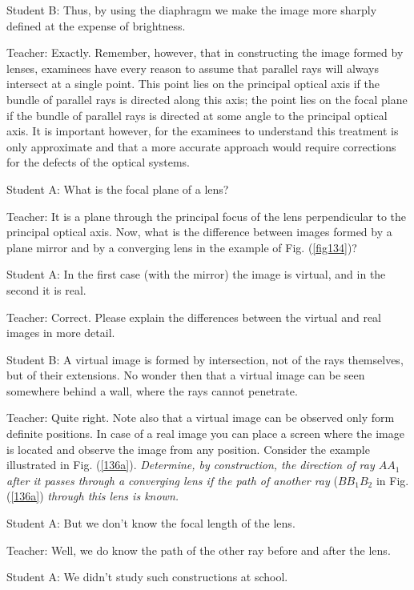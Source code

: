 \documentclass[a4paper,12pt]{book}
\begin{document}
{{\sc Student B:} Thus, by using the diaphragm we make the image more sharply defined at the expense of brightness.

{\sc Teacher:} Exactly. Remember, however, that in constructing the image formed by lenses, examinees have every reason to assume that parallel rays will always intersect at a single point. This point lies on the principal optical axis if the bundle of parallel rays is directed along this axis; the point lies on the focal plane if the bundle of parallel rays is directed at some angle to the principal optical axis. It is important however, for the examinees to understand this treatment is only approximate and that a more accurate approach would require corrections for the defects of the optical systems.

{\sc Student A:} What is the focal plane of a lens?

{\sc Teacher:} It is a plane through the principal focus of the lens perpendicular to the principal optical axis. Now, what is the difference between images formed by a plane mirror and by a converging lens in the example of Fig. (\ref{fig134})?

{\sc Student A:} In the first case (with the mirror) the image is virtual, and in the second it is real.

{\sc Teacher:} Correct. Please explain the differences between the virtual and real images in more detail.

{\sc Student B:} A virtual image is formed by intersection, not of the rays themselves, but of their extensions. No wonder then that a virtual image can be seen somewhere behind a wall, where the rays cannot penetrate.

{\sc Teacher:} Quite right. Note also that a virtual image can be observed only form definite positions. In case of a real image you can place a screen where the image is located and observe the image from any position. Consider the example illustrated in Fig. (\ref{136a}). \emph{Determine, by construction, the direction of ray $AA_{1}$ after it passes through a converging lens if the path of another ray }($BB_{1}B_{2}$ in Fig. (\ref{136a}) \emph{through this lens is known.}

{\sc Student A:} But we don't know the focal length of the lens. 

{\sc Teacher:} Well, we do know the path of the other ray before and after the lens.

{\sc Student A:} We didn't study such constructions at school.

}
\end{document}
